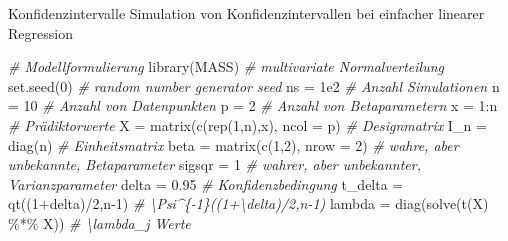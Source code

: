 \documentclass[
  8pt,
  ignorenonframetext,
]{beamer}
\newenvironment{Shaded}{\begin{snugshade}}{\end{snugshade}}
\newcommand{\AttributeTok}[1]{\textcolor[rgb]{0.77,0.63,0.00}{#1}}
\newcommand{\CommentTok}[1]{\textcolor[rgb]{0.56,0.35,0.01}{\textit{#1}}}
\newcommand{\DecValTok}[1]{\textcolor[rgb]{0.00,0.00,0.81}{#1}}
\newcommand{\FloatTok}[1]{\textcolor[rgb]{0.00,0.00,0.81}{#1}}
\newcommand{\FunctionTok}[1]{\textcolor[rgb]{0.00,0.00,0.00}{#1}}
\newcommand{\NormalTok}[1]{#1}
\newcommand{\OtherTok}[1]{\textcolor[rgb]{0.56,0.35,0.01}{#1}}
\newcommand{\SpecialCharTok}[1]{\textcolor[rgb]{0.00,0.00,0.00}{#1}}
\begin{document}
\begin{frame}[fragile]{Konfidenzintervalle}
\protect\hypertarget{konfidenzintervalle-4}{}
Simulation von Konfidenzintervallen bei einfacher linearer Regression

\vspace{1mm}
\tiny

\begin{Shaded}
\begin{Highlighting}[]
\CommentTok{\# Modellformulierung}
\FunctionTok{library}\NormalTok{(MASS)                                                       }\CommentTok{\# multivariate Normalverteilung}
\FunctionTok{set.seed}\NormalTok{(}\DecValTok{0}\NormalTok{)                                                         }\CommentTok{\# random number generator seed}
\NormalTok{ns         }\OtherTok{=} \FloatTok{1e2}                                                    \CommentTok{\# Anzahl Simulationen}
\NormalTok{n          }\OtherTok{=} \DecValTok{10}                                                     \CommentTok{\# Anzahl von Datenpunkten}
\NormalTok{p          }\OtherTok{=} \DecValTok{2}                                                      \CommentTok{\# Anzahl von Betaparametern}
\NormalTok{x          }\OtherTok{=} \DecValTok{1}\SpecialCharTok{:}\NormalTok{n                                                    }\CommentTok{\# Prädiktorwerte}
\NormalTok{X          }\OtherTok{=} \FunctionTok{matrix}\NormalTok{(}\FunctionTok{c}\NormalTok{(}\FunctionTok{rep}\NormalTok{(}\DecValTok{1}\NormalTok{,n),x), }\AttributeTok{ncol =}\NormalTok{ p)                        }\CommentTok{\# Designmatrix}
\NormalTok{I\_n        }\OtherTok{=} \FunctionTok{diag}\NormalTok{(n)                                                }\CommentTok{\# Einheitsmatrix}
\NormalTok{beta       }\OtherTok{=} \FunctionTok{matrix}\NormalTok{(}\FunctionTok{c}\NormalTok{(}\DecValTok{1}\NormalTok{,}\DecValTok{2}\NormalTok{), }\AttributeTok{nrow =} \DecValTok{2}\NormalTok{)                               }\CommentTok{\# wahre, aber unbekannte, Betaparameter}
\NormalTok{sigsqr     }\OtherTok{=} \DecValTok{1}                                                      \CommentTok{\# wahrer, aber unbekannter, Varianzparameter}
\NormalTok{delta      }\OtherTok{=} \FloatTok{0.95}                                                   \CommentTok{\# Konfidenzbedingung  }
\NormalTok{t\_delta    }\OtherTok{=} \FunctionTok{qt}\NormalTok{((}\DecValTok{1}\SpecialCharTok{+}\NormalTok{delta)}\SpecialCharTok{/}\DecValTok{2}\NormalTok{,n}\DecValTok{{-}1}\NormalTok{)                                    }\CommentTok{\# \textbackslash{}Psi\^{}\{{-}1\}((1+\textbackslash{}delta)/2,n{-}1)}
\NormalTok{lambda     }\OtherTok{=} \FunctionTok{diag}\NormalTok{(}\FunctionTok{solve}\NormalTok{(}\FunctionTok{t}\NormalTok{(X) }\SpecialCharTok{\%*\%}\NormalTok{ X))                                }\CommentTok{\# \textbackslash{}lambda\_j Werte}


\end{Highlighting}
\end{Shaded}
\end{frame}
\end{document}
